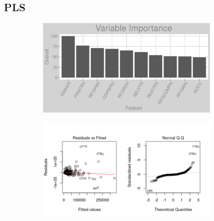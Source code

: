 \subsection{PLS}
\label{appendix:district_heat:pls}
\begin{figure}[h]
\centering
\begin{subfigure}{1\textwidth}
\centering
\includegraphics[width=.99\textwidth, height=0.3\textheight]{Images/district_heat_pls_vars.png}
\end{subfigure}
\begin{subfigure}{1\textwidth}
\centering
\includegraphics[width=.99\textwidth, height=0.475\textheight]{Images/district_heat_pls_res_1.png}
\end{subfigure}
\end{figure}
\FloatBarrier
\newpage
